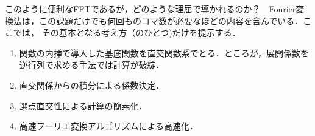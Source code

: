このように便利なFFTであるが，どのような理屈で導かれるのか？　Fourier変換法は，この課題だけでも何回ものコマ数が必要なほどの内容を含んでいる．ここでは，
その基本となる考え方（のひとつ)だけを提示する．
\begin{enumerate}
\item 関数の内挿で導入した基底関数を直交関数系でとる．ところが，展開係数を逆行列で求める手法では計算が破綻．
\item 直交関係からの積分による係数決定．
\item 選点直交性による計算の簡素化．
\item 高速フーリエ変換アルゴリズムによる高速化．
\end{enumerate}
